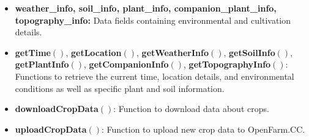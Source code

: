\begin{itemize}
\begin{itemize}
        \item \textbf{weather\_info, soil\_info, plant\_info, companion\_plant\_info, topography\_info:} Data fields containing environmental and cultivation details.
        \item \textbf{getTime}$()$, \textbf{getLocation}$()$, \textbf{getWeatherInfo}$()$, \textbf{getSoilInfo}$()$, \textbf{getPlantInfo}$()$, \textbf{getCompanionInfo}$()$, \textbf{getTopographyInfo}$()$: Functions to retrieve the current time, location details, and environmental conditions as well as specific plant and soil information.
        \item \textbf{downloadCropData}$()$: Function to download data about crops.
        \item \textbf{uploadCropData}$()$: Function to upload new crop data to OpenFarm.CC.
    \end{itemize}
\end{itemize}

\newpage
